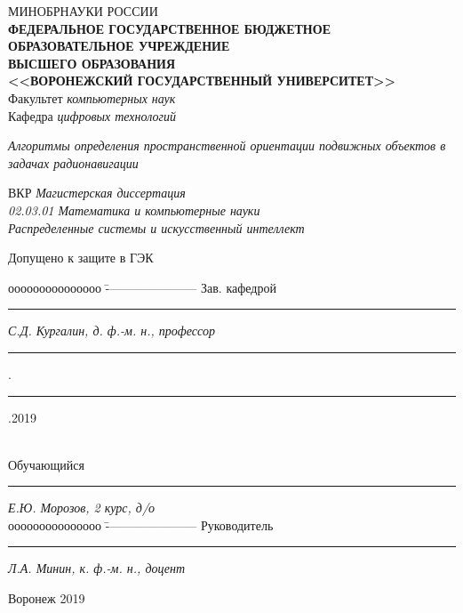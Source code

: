 \documentclass[../main.tex]{subfiles}
\begin{document}
\begin{spacing}{1.2}
{\sffamily \begin{small}
\thispagestyle{empty}
\center
{МИНОБРНАУКИ РОССИИ}\\ \!
{\footnotesize\textbf{ФЕДЕРАЛЬНОЕ ГОСУДАРСТВЕННОЕ БЮДЖЕТНОЕ ОБРАЗОВАТЕЛЬНОЕ УЧРЕЖДЕНИЕ}\\ \!\!\textbf{ВЫСШЕГО ОБРАЗОВАНИЯ}}\\ \!\!\!\!
\textbf{<<ВОРОНЕЖСКИЙ ГОСУДАРСТВЕННЫЙ УНИВЕРСИТЕТ>>}\\
\vspace{0.25cm}
{Факультет \textit{компьютерных наук}}\\
\vspace{0.25cm}
{Кафедра \textit{цифровых технологий}}\\

\vspace{1cm}

\textit{Алгоритмы определения пространственной ориентации подвижных объектов в задачах радионавигации}\\

\vspace{1cm}

{ВКР} \textit{Магистерская диссертация}\\
\textit{02.03.01 Математика и компьютерные науки}\\
\textit{Распределенные системы и искусственный интеллект}\\

\vspace{4.0cm}
\begin{flushleft}
{Допущено к защите в ГЭК}
\end{flushleft}
\begin{tabbing}
ооооооооооооооо	\=	----------------------	\kill
Зав. кафедрой\> 	\rule[0mm]{3cm}{0,3mm}	\textit{С.Д. Кургалин, д. ф.-м. н., профессор}{ \rule[0mm]{5mm}{0,3mm}.\rule[0mm]{5mm}{0,3mm}.2019}  \\
Обучающийся \> 	\rule[0mm]{3cm}{0,3mm}	\textit{Е.Ю. Морозов, 2 курс, д/о} \\
ооооооооооооооо	\=	----------------------	\kill
Руководитель\> 	\rule[0mm]{3cm}{0,3mm}  \textit{Л.А. Минин, к. ф.-м. н., доцент}
\end{tabbing}

\vspace{2cm}

\centerline{Воронеж 2019}
\end{small}}
\end{spacing}
\clearpage
\end{document}
